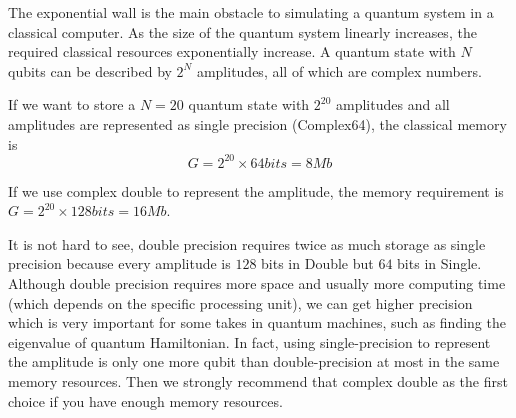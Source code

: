 The exponential wall is the main obstacle to simulating a quantum system in a classical computer.
As the size of the quantum system linearly increases, the required classical resources exponentially increase.
A quantum state with $N$ qubits can be described by $2^N$ amplitudes, all of which are complex numbers.

If we want to store a $N=20$ quantum state with $2^20$ amplitudes and all amplitudes are represented as single precision (Complex64), the classical memory is
\begin{equation}
    G=2^{20}\times 64 bits = 8 Mb
\end{equation}

If we use complex double to represent the amplitude, the memory requirement is $G=2^{20}\times 128 bits=16 Mb$.

It is not hard to see, double precision requires twice as much storage as single precision because every amplitude is $128$ bits in Double but $64$ bits in Single.
Although double precision requires more space and usually more computing time (which depends on the specific processing unit), we can get higher precision which is very important for some takes in quantum machines, such as finding the eigenvalue of quantum Hamiltonian.
In fact, using single-precision to represent the amplitude is only one more qubit than double-precision at most in the same memory resources.
Then we strongly recommend that complex double as the first choice if you have enough memory resources.